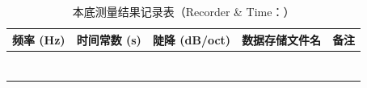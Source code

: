 \begin{table}[h!]
	\centering
	\caption{本底测量结果记录表（Recorder \& Time：\hspace{4cm}）}
	\label{tab:nB}
	\begin{tabular}{|c|c|c|c|c|}
		\hline
		\textbf{频率 (Hz)} & \textbf{时间常数 (s)} & \textbf{陡降 (dB/oct)} & \textbf{数据存储文件名} & \textbf{备注} \\
		\hline
		\hspace{2.5cm} & \hspace{2.5cm} & \hspace{2.5cm} & \hspace{4cm} & \hspace{4cm} \\
		\hline
		\hspace{2.5cm} & \hspace{2.5cm} & \hspace{2.5cm} & \hspace{4cm} & \hspace{4cm} \\
		\hline
		\hspace{2.5cm} & \hspace{2.5cm} & \hspace{2.5cm} & \hspace{4cm} & \hspace{4cm} \\
		\hline
		\hspace{2.5cm} & \hspace{2.5cm} & \hspace{2.5cm} & \hspace{4cm} & \hspace{4cm} \\
		\hline
		\hspace{2.5cm} & \hspace{2.5cm} & \hspace{2.5cm} & \hspace{4cm} & \hspace{4cm} \\
		\hline
		\hspace{2.5cm} & \hspace{2.5cm} & \hspace{2.5cm} & \hspace{4cm} & \hspace{4cm} \\
		\hline
		\hspace{2.5cm} & \hspace{2.5cm} & \hspace{2.5cm} & \hspace{4cm} & \hspace{4cm} \\

\end{tabular}
\end{table}
